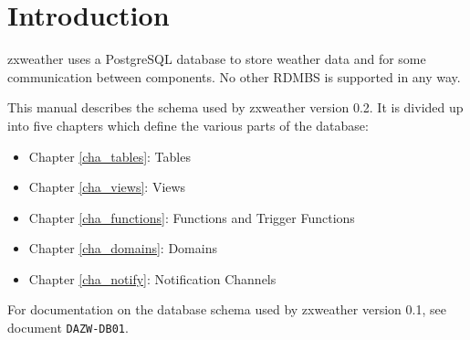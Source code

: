 \documentclass[a4paper,10pt]{book}
\newcommand{\partnumber}{\ifthenelse{\isundefined{\projectnum}}{}{\projectnum-\docnum	\ifthenelse{\equal{\docrev}{001}}{}{.\docrev}}}
\begin{document}

\ifthenelse{\isundefined{\ordernumber}}{

\title{\doctitle{} - \docsubtitle}
\author{\docauthor}
}{

\title{\doctitle}
\subtitle{\docsubtitle}
\titleabstract{\docabstract}
\ordernumber{\partnumber}
\updateinfo{\docupdateinfo}
\osinfo{\docosver}
\swversion{\docswver}
\titlecopyright{\doccopyright}
\licensestatement{\doclicense}
}
\date{\docdate}

\maketitle

\clearpage

\tableofcontents
\clearpage


\chapter{Introduction}
\setcounter{page}{1}

zxweather uses a PostgreSQL database to store weather data and for some communication between components. No other RDMBS is supported in any way.

This manual describes the schema used by zxweather version 0.2. It is divided up into five chapters which define the various parts of the database:
\begin{itemize}
\item Chapter \ref{cha_tables}: Tables
\item Chapter \ref{cha_views}: Views
\item Chapter \ref{cha_functions}: Functions and Trigger Functions
\item Chapter \ref{cha_domains}: Domains
\item Chapter \ref{cha_notify}: Notification Channels
\end{itemize}

For documentation on the database schema used by zxweather version 0.1, see document \verb|DAZW-DB01|.
\end{document}
